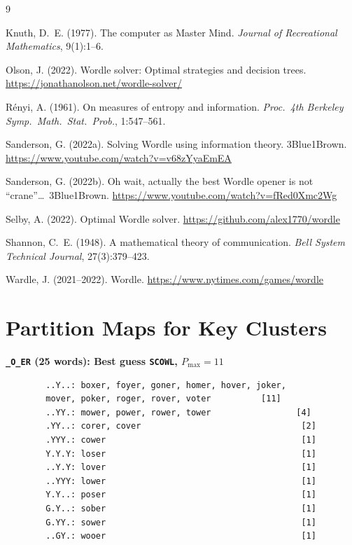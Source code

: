 \documentclass[11pt]{article}
\begin{document}
	\begin{thebibliography}{9}
		
		Knuth, D.~E. (1977).
		The computer as Master Mind.
		\textit{Journal of Recreational Mathematics}, 9(1):1--6.
		
		Olson, J. (2022).
		Wordle solver: Optimal strategies and decision trees.
		\url{https://jonathanolson.net/wordle-solver/}
		
		R\'enyi, A. (1961).
		On measures of entropy and information.
		\textit{Proc.\ 4th Berkeley Symp.\ Math.\ Stat.\ Prob.}, 1:547--561.
		
		Sanderson, G. (2022a).
		Solving Wordle using information theory.
		3Blue1Brown.
		\url{https://www.youtube.com/watch?v=v68zYyaEmEA}
		
		Sanderson, G. (2022b).
		Oh wait, actually the best Wordle opener is not ``crane''\ldots\ 3Blue1Brown.
		\url{https://www.youtube.com/watch?v=fRed0Xmc2Wg}
		
		Selby, A. (2022).
		Optimal Wordle solver.
		\url{https://github.com/alex1770/wordle}
		
		Shannon, C.~E. (1948).
		A mathematical theory of communication.
		\textit{Bell System Technical Journal}, 27(3):379--423.
		
		Wardle, J. (2021--2022).
		Wordle.
		\url{https://www.nytimes.com/games/wordle}
		
	\end{thebibliography}
	
	\appendix
	
	\section{Partition Maps for Key Clusters}
	
	\textbf{\texttt{\_O\_ER} (25 words): Best guess \texttt{SCOWL}, $P_{\max} = 11$}
	
	\begin{verbatim}
		..Y..: boxer, foyer, goner, homer, hover, joker,
		mover, poker, roger, rover, voter          [11]
		..YY.: mower, power, rower, tower                 [4]
		.YY..: corer, cover                                [2]
		.YYY.: cower                                       [1]
		Y.Y.Y: loser                                       [1]
		..Y.Y: lover                                       [1]
		..YYY: lower                                       [1]
		Y.Y..: poser                                       [1]
		G.Y..: sober                                       [1]
		G.YY.: sower                                       [1]
		..GY.: wooer                                       [1]
	\end{verbatim}
	
\end{document}
